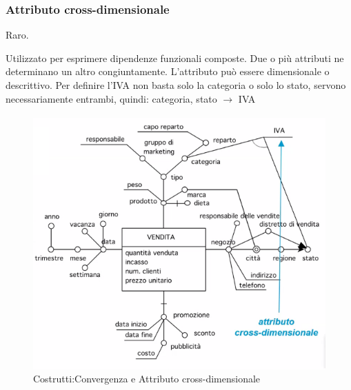 \subsubsection{Attributo cross-dimensionale}
\begin{info}
	Raro.
\end{info}
Utilizzato per esprimere dipendenze funzionali composte. Due o più attributi ne determinano un altro congiuntamente. L'attributo può essere dimensionale o descrittivo. Per definire l'IVA non basta solo la categoria o solo lo stato, servono necessariamente entrambi, quindi:\newline
categoria, stato  $\xrightarrow[]{}$ IVA
\begin{figure}[H]
	\begin{center}
		\includegraphics[width=0.7\linewidth]{img/crossdiv.png}
		\caption{Costrutti:Convergenza e Attributo cross-dimensionale}
	\end{center}
\end{figure}
